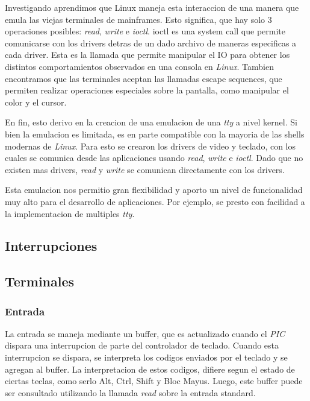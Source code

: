 \documentclass[a4paper,10pt]{article}
\begin{document}
    Investigando aprendimos que Linux maneja esta interaccion de una manera que emula las viejas terminales de mainframes.
    Esto significa, que hay solo 3 operaciones posibles: \textit{read}, \textit{write} e \textit{ioctl}.
    ioctl es una system call que permite comunicarse con los drivers detras de un dado archivo de maneras especificas a cada driver.
    Esta es la llamada que permite manipular el IO para obtener los distintos comportamientos observados en una consola en \textit{Linux}.
    Tambien encontramos que las terminales aceptan las llamadas escape sequences, que permiten realizar operaciones especiales sobre la pantalla, como manipular el color y el cursor.

    En fin, esto derivo en la creacion de una emulacion de una \textit{tty} a nivel kernel.
    Si bien la emulacion es limitada, es en parte compatible con la mayoria de las shells modernas de \textit{Linux}.
    Para esto se crearon los drivers de video y teclado, con los cuales se comunica desde las aplicaciones usando \textit{read}, \textit{write} e \textit{ioctl}.
    Dado que no existen mas drivers, \textit{read} y \textit{write} se comunican directamente con los drivers.

    Esta emulacion nos permitio gran flexibilidad y aporto un nivel de funcionalidad muy alto para el desarrollo de aplicaciones.
    Por ejemplo, se presto con facilidad a la implementacion de multiples \textit{tty}.

    \subsection{Interrupciones}

    \subsection{Terminales}
        \subsubsection{Entrada}
            La entrada se maneja mediante un buffer, que es actualizado cuando el \textit{PIC} dispara una interrupcion de parte del controlador de teclado.
            Cuando esta interrupcion se dispara, se interpreta los codigos enviados por el teclado y se agregan al buffer.
            La interpretacion de estos codigos, difiere segun el estado de ciertas teclas, como serlo Alt, Ctrl, Shift y Bloc Mayus.
            Luego, este buffer puede ser consultado utilizando la llamada \textit{read} sobre la entrada standard.
\end{document}
